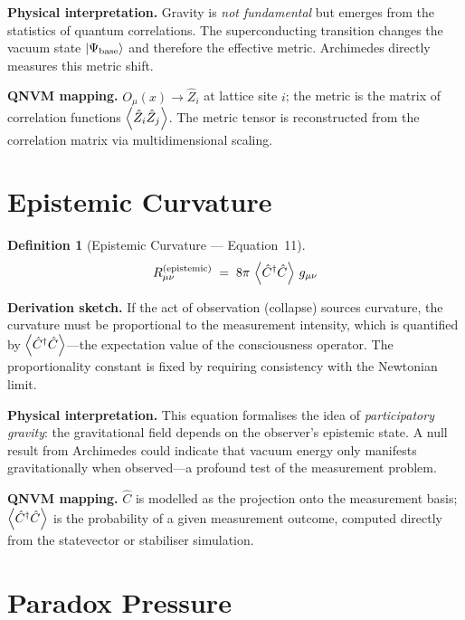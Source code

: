 \documentclass[11pt,a4paper]{article}
\newtheorem{definition}{Definition}[section]
\theoremstyle{remark}
\newcommand{\Cop}{\hat{C}}
\newcommand{\base}{\Psi_{\text{base}}}
\begin{document}
\textbf{Physical interpretation.}\quad
Gravity is \emph{not fundamental} but emerges from the statistics of quantum correlations.  The superconducting transition changes the vacuum state $\ket{\base}$ and therefore the effective metric.  Archimedes directly measures this metric shift.

\textbf{QNVM mapping.}\quad
$O_\mu(x) \to \hat{Z}_i$ at lattice site $i$; the metric is the matrix of correlation functions $\expval{\hat{Z}_i \hat{Z}_j}$.  The metric tensor is reconstructed from the correlation matrix via multidimensional scaling.

\section{Epistemic Curvature}
\label{sec:eq11}

\begin{definition}[Epistemic Curvature --- Equation~11]
\begin{equation}\label{eq:epistemic}
    R_{\mu\nu}^{(\text{epistemic})} \;=\; 8\pi\,\expval{\Cop^\dagger\Cop}\, g_{\mu\nu}
\end{equation}
\end{definition}

\textbf{Derivation sketch.}\quad
If the act of observation (collapse) sources curvature, the curvature must be proportional to the measurement intensity, which is quantified by $\expval{\Cop^\dagger\Cop}$---the expectation value of the consciousness operator.  The proportionality constant is fixed by requiring consistency with the Newtonian limit.

\textbf{Physical interpretation.}\quad
This equation formalises the idea of \emph{participatory gravity}: the gravitational field depends on the observer's epistemic state.  A null result from Archimedes could indicate that vacuum energy only manifests gravitationally when observed---a profound test of the measurement problem.

\textbf{QNVM mapping.}\quad
$\Cop$ is modelled as the projection onto the measurement basis; $\expval{\Cop^\dagger\Cop}$ is the probability of a given measurement outcome, computed directly from the statevector or stabiliser simulation.

\section{Paradox Pressure}
\label{sec:eq12}
\end{document}
